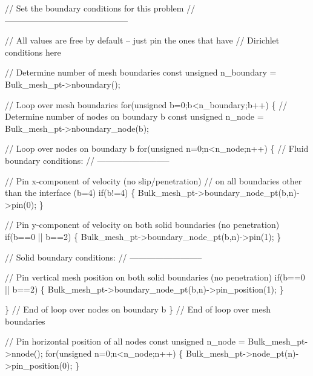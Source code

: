 \begin{DoxyCodeInclude}
 \textcolor{comment}{// Set the boundary conditions for this problem}
 \textcolor{comment}{// --------------------------------------------}
 
 \textcolor{comment}{// All values are free by default -- just pin the ones that have}
 \textcolor{comment}{// Dirichlet conditions here}

 \textcolor{comment}{// Determine number of mesh boundaries}
 \textcolor{keyword}{const} \textcolor{keywordtype}{unsigned} n\_boundary = Bulk\_mesh\_pt->nboundary();
 
 \textcolor{comment}{// Loop over mesh boundaries}
 \textcolor{keywordflow}{for}(\textcolor{keywordtype}{unsigned} b=0;b<n\_boundary;b++)
  \{
   \textcolor{comment}{// Determine number of nodes on boundary b}
   \textcolor{keyword}{const} \textcolor{keywordtype}{unsigned} n\_node = Bulk\_mesh\_pt->nboundary\_node(b);

   \textcolor{comment}{// Loop over nodes on boundary b}
   \textcolor{keywordflow}{for}(\textcolor{keywordtype}{unsigned} n=0;n<n\_node;n++)
    \{
     \textcolor{comment}{// Fluid boundary conditions:}
     \textcolor{comment}{// --------------------------}

     \textcolor{comment}{// Pin x-component of velocity (no slip/penetration)}
     \textcolor{comment}{// on all boundaries other than the interface (b=4)}
     \textcolor{keywordflow}{if}(b!=4) \{ Bulk\_mesh\_pt->boundary\_node\_pt(b,n)->pin(0); \}

     \textcolor{comment}{// Pin y-component of velocity on both solid boundaries (no penetration)}
     \textcolor{keywordflow}{if}(b==0 || b==2) \{ Bulk\_mesh\_pt->boundary\_node\_pt(b,n)->pin(1); \}

     \textcolor{comment}{// Solid boundary conditions:}
     \textcolor{comment}{// --------------------------}

     \textcolor{comment}{// Pin vertical mesh position on both solid boundaries (no penetration)}
     \textcolor{keywordflow}{if}(b==0 || b==2) \{ Bulk\_mesh\_pt->boundary\_node\_pt(b,n)->pin\_position(1); \}

    \} \textcolor{comment}{// End of loop over nodes on boundary b}
  \} \textcolor{comment}{// End of loop over mesh boundaries}

 \textcolor{comment}{// Pin horizontal position of all nodes}
 \textcolor{keyword}{const} \textcolor{keywordtype}{unsigned} n\_node = Bulk\_mesh\_pt->nnode();
 \textcolor{keywordflow}{for}(\textcolor{keywordtype}{unsigned} n=0;n<n\_node;n++) \{ Bulk\_mesh\_pt->node\_pt(n)->pin\_position(0); \}

\end{DoxyCodeInclude}


